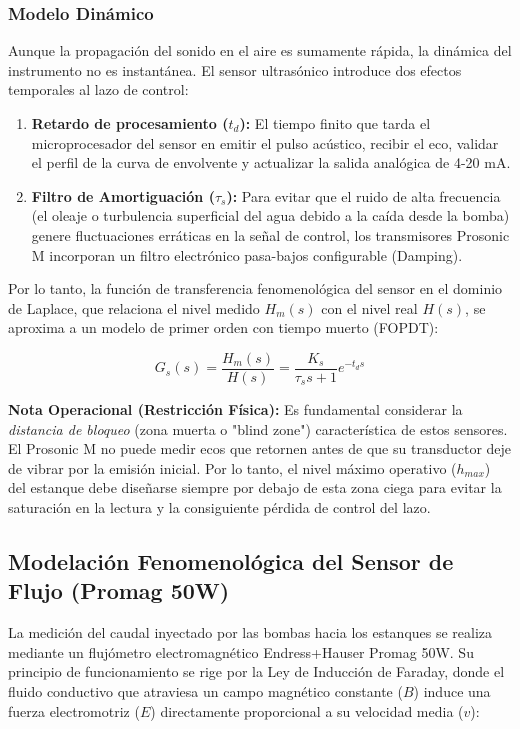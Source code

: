 \subsubsection{Modelo Dinámico}
Aunque la propagación del sonido en el aire es sumamente rápida, la dinámica del instrumento no es instantánea. El sensor ultrasónico introduce dos efectos temporales al lazo de control:
\begin{enumerate}
    \item \textbf{Retardo de procesamiento ($t_d$):} El tiempo finito que tarda el microprocesador del sensor en emitir el pulso acústico, recibir el eco, validar el perfil de la curva de envolvente y actualizar la salida analógica de 4-20 mA.
    \item \textbf{Filtro de Amortiguación ($\tau_s$):} Para evitar que el ruido de alta frecuencia (el oleaje o turbulencia superficial del agua debido a la caída desde la bomba) genere fluctuaciones erráticas en la señal de control, los transmisores Prosonic M incorporan un filtro electrónico pasa-bajos configurable (Damping).
\end{enumerate}

Por lo tanto, la función de transferencia fenomenológica del sensor en el dominio de Laplace, que relaciona el nivel medido $H_m(s)$ con el nivel real $H(s)$, se aproxima a un modelo de primer orden con tiempo muerto (FOPDT):

\begin{equation}
  G_s(s) = \frac{H_m(s)}{H(s)} = \frac{K_s}{\tau_s s + 1} e^{-t_d s}
  \label{eq:dinamica_sensor}
\end{equation}

\textbf{Nota Operacional (Restricción Física):} Es fundamental considerar la \textit{distancia de bloqueo} (zona muerta o "blind zone") característica de estos sensores. El Prosonic M no puede medir ecos que retornen antes de que su transductor deje de vibrar por la emisión inicial. Por lo tanto, el nivel máximo operativo ($h_{max}$) del estanque debe diseñarse siempre por debajo de esta zona ciega para evitar la saturación en la lectura y la consiguiente pérdida de control del lazo.

\subsection{Modelación Fenomenológica del Sensor de Flujo (Promag 50W)}

La medición del caudal inyectado por las bombas hacia los estanques se realiza mediante un flujómetro electromagnético Endress+Hauser Promag 50W. Su principio de funcionamiento se rige por la Ley de Inducción de Faraday, donde el fluido conductivo que atraviesa un campo magnético constante ($B$) induce una fuerza electromotriz ($E$) directamente proporcional a su velocidad media ($v$):

